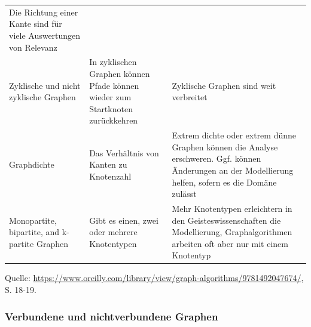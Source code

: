 \documentclass[12pt,ngerman,]{article}
\begin{document}
\begin{longtable}[]{@{}lll@{}}
\begin{minipage}[t]{0.59\columnwidth}
Die Richtung einer Kante sind für viele Auswertungen von Relevanz\strut
\end{minipage}\tabularnewline
\begin{minipage}[t]{0.14\columnwidth}\raggedright\strut
Zyklische und nicht zyklische Graphen\strut
\end{minipage} & \begin{minipage}[t]{0.18\columnwidth}\raggedright\strut
In zyklischen Graphen können Pfade können wieder zum Startknoten
zurückkehren\strut
\end{minipage} & \begin{minipage}[t]{0.59\columnwidth}\raggedright\strut
Zyklische Graphen sind weit verbreitet\strut
\end{minipage}\tabularnewline
\begin{minipage}[t]{0.14\columnwidth}\raggedright\strut
Graphdichte\strut
\end{minipage} & \begin{minipage}[t]{0.18\columnwidth}\raggedright\strut
Das Verhältnis von Kanten zu Knotenzahl\strut
\end{minipage} & \begin{minipage}[t]{0.59\columnwidth}\raggedright\strut
Extrem dichte oder extrem dünne Graphen können die Analyse erschweren.
Ggf. können Änderungen an der Modellierung helfen, sofern es die Domäne
zulässt\strut
\end{minipage}\tabularnewline
\begin{minipage}[t]{0.14\columnwidth}\raggedright\strut
Monopartite, bipartite, and k-partite Graphen\strut
\end{minipage} & \begin{minipage}[t]{0.18\columnwidth}\raggedright\strut
Gibt es einen, zwei oder mehrere Knotentypen\strut
\end{minipage} & \begin{minipage}[t]{0.59\columnwidth}\raggedright\strut
Mehr Knotentypen erleichtern in den Geisteswissenschaften die
Modellierung, Graphalgorithmen arbeiten oft aber nur mit einem
Knotentyp\strut
\end{minipage}\tabularnewline
\bottomrule
\end{longtable}

Quelle:
\href{Needham/Hodler\%202019}{https://www.oreilly.com/library/view/graph-algorithms/9781492047674/},
S. 18-19.

\subsubsection{Verbundene und nichtverbundene
Graphen}\label{verbundene-und-nichtverbundene-graphen}
\end{document}
